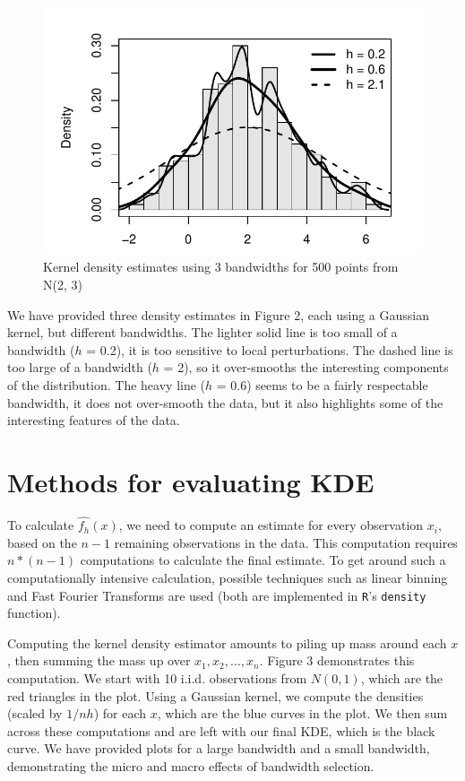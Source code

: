 \documentclass[]{article}
\begin{document}
\begin{figure}[htbp]
\centering
\includegraphics{FinalReport_files/figure-latex/unnamed-chunk-3-1.pdf}
\caption{Kernel density estimates using 3 bandwidths for 500 points from
N(2, 3)}
\end{figure}

We have provided three density estimates in Figure 2, each using a
Gaussian kernel, but different bandwidths. The lighter solid line is too
small of a bandwidth (\(h\) = 0.2), it is too sensitive to local
perturbations. The dashed line is too large of a bandwidth (\(h\) = 2),
so it over-smooths the interesting components of the distribution. The
heavy line (\(h\) = 0.6) seems to be a fairly respectable bandwidth, it
does not over-smooth the data, but it also highlights some of the
interesting features of the data.

\newpage

\section{Methods for evaluating KDE}\label{methods-for-evaluating-kde}

To calculate \(\widehat{f_h}(x)\), we need to compute an estimate for
every observation \(x_i\), based on the \(n-1\) remaining observations
in the data. This computation requires \(n * (n-1)\) computations to
calculate the final estimate. To get around such a computationally
intensive calculation, possible techniques such as linear binning and
Fast Fourier Transforms are used (both are implemented in \texttt{R}'s
\texttt{density} function).

Computing the kernel density estimator amounts to piling up mass around
each \(x\), then summing the mass up over \(x_1, x_2, \ldots, x_n\).
Figure 3 demonstrates this computation. We start with 10 i.i.d.
observations from \(N(0,1)\), which are the red triangles in the plot.
Using a Gaussian kernel, we compute the densities (scaled by \(1/nh\))
for each \(x\), which are the blue curves in the plot. We then sum
across these computations and are left with our final KDE, which is the
black curve. We have provided plots for a large bandwidth and a small
bandwidth, demonstrating the micro and macro effects of bandwidth
selection.
\end{document}
